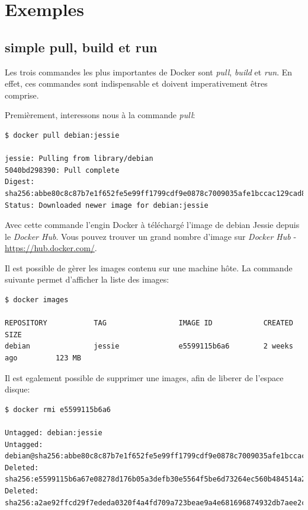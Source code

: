 \section{Exemples}
\subsection{simple pull, build et run}
Les trois commandes les plus importantes de Docker sont \emph{pull}, \emph{build} et \emph{run}. En effet, ces commandes sont indispensable et doivent imperativement êtres comprise.

Premièrement, interessons nous à la commande \emph{pull}:

\begin{lstlisting}[frame=single]
$ docker pull debian:jessie

jessie: Pulling from library/debian
5040bd298390: Pull complete 
Digest: sha256:abbe80c8c87b7e1f652fe5e99ff1799cdf9e0878c7009035afe1bccac129cad8
Status: Downloaded newer image for debian:jessie
\end{lstlisting}

Avec cette commande l'engin Docker à téléchargé l'image de debian Jessie depuis le \emph{Docker Hub}. Vous pouvez trouver un grand nombre d'image sur \emph{Docker Hub} - \hyperref[Docker Hub]{https://hub.docker.com/}.

Il est possible de gèrer les images contenu sur une machine hôte. La commande suivante permet d'afficher la liste des images:

\begin{lstlisting}[frame=single]
$ docker images

REPOSITORY           TAG                 IMAGE ID            CREATED             SIZE
debian               jessie              e5599115b6a6        2 weeks ago         123 MB
\end{lstlisting}

Il est egalement possible de supprimer une images, afin de liberer de l'espace disque:

\begin{lstlisting}[frame=single]
$ docker rmi e5599115b6a6

Untagged: debian:jessie
Untagged: debian@sha256:abbe80c8c87b7e1f652fe5e99ff1799cdf9e0878c7009035afe1bccac129cad8
Deleted: sha256:e5599115b6a67e08278d176b05a3defb30e5564f5be6d73264ec560b484514a2
Deleted: sha256:a2ae92ffcd29f7ededa0320f4a4fd709a723beae9a4e681696874932db7aee2c
\end{lstlisting}

